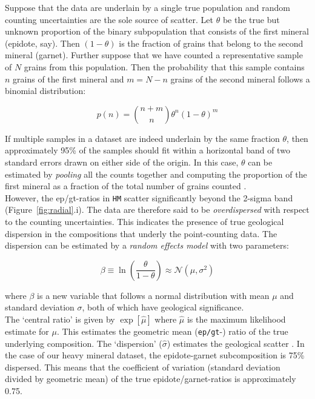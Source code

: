 \documentclass[11pt]{article}
\begin{document}
Suppose that the data are underlain by a single true population and
random counting uncertainties are the sole source of scatter.  Let
$\theta$ be the true but unknown proportion of the binary
subpopulation that consists of the first mineral (epidote, say). Then
$(1-\theta)$ is the fraction of grains that belong to the second
mineral (garnet).  Further suppose that we have counted a
representative sample of $N$ grains from this population. Then the
probability that this sample contains $n$ grains of the first mineral
and $m=N-n$ grains of the second mineral follows a binomial
distribution:

\begin{equation}
  p(n) = \binom{n+m}{n} \theta^n (1-\theta)^m
  \label{eq:binom}
\end{equation}
  
If multiple samples in a dataset are indeed underlain by the same
fraction $\theta$, then approximately 95\% of the samples should fit
within a horizontal band of two standard errors drawn on either side
of the origin. In this case, $\theta$ can be estimated by
\emph{pooling} all the counts together and computing the proportion of
the first mineral as a fraction of the total number of grains counted
\citep{vermeesch2018d}.\\

However, the ep/gt-ratios in \texttt{HM} scatter significantly beyond
the 2-sigma band (Figure~\ref{fig:radial}.i). The data are therefore
said to be \emph{overdispersed} with respect to the counting
uncertainties. This indicates the presence of true geological
dispersion in the compositions that underly the point-counting data.
The dispersion can be estimated by a \emph{random effects model} with
two parameters:

\begin{equation}
  \beta \equiv \ln\left(\frac{\theta}{1-\theta}\right) \approx
  \mathcal{N}(\mu,\sigma^2)
  \label{eq:central}
\end{equation}

\noindent where $\beta$ is a new variable that follows a normal
distribution with mean $\mu$ and standard deviation $\sigma$, both of
which have geological significance.\\

The `central ratio' is given by $\exp[\hat{\mu}]$ where $\hat{\mu}$ is
the maximum likelihood estimate for $\mu$. This estimates the
geometric mean (\texttt{ep/gt}-) ratio of the true underlying
composition. The `dispersion' ($\hat{\sigma}$) estimates the
geological scatter \citep{galbraith1990a, vermeesch2018d}. In the case
of our heavy mineral dataset, the epidote-garnet subcomposition is
75\% dispersed. This means that the coefficient of variation (standard
deviation divided by geometric mean) of the true epidote/garnet-ratios
is approximately 0.75.
\end{document}

